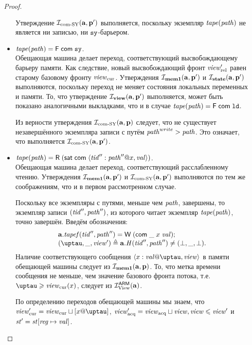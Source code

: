 \begin{proof}
\begin{itemize}
     Утверждение $\mathcal{I}_{\textup{\rm com-SY}}(\mathbf{a}, \mathbf{p}')$ выполняется, поскольку экземпляр $\mathit{tape}(\mathit{path})$ не является ни записью,
     ни $\mathtt{sy}$-барьером.

   \item $\mathit{tape}(\mathit{path}) = \textsf{F} \; \mathsf{com} \; \mathtt{sy}$. \\
    Обещающая машина делает переход, соответствующий высвобождающему барьеру памяти.
    Как следствие, новый высвобождающий фронт $\mathit{view}_{\mathrm{rel}}'$ равен старому базовому фронту $\mathit{view}_{\mathrm{cur}}$.
    Утверждения $\mathcal{I}_{\rm \bf mem1}(\mathbf{a}, \mathbf{p}')$ и $\mathcal{I}_{\rm \bf state}(\mathbf{a}, \mathbf{p}')$ выполняются, поскольку
    переход не меняет состояния локальных переменных и памяти.
    То, что утверждение $\mathcal{I}_{\rm \bf view}(\mathbf{a}, \mathbf{p}')$ выполняется, может быть показано аналогичными выкладками,
    что и в случае $\mathit{tape}(\mathit{path}) = \textsf{F} \; \mathsf{com} \; \mathtt{ld}$.
     
    Из верности утверждения $\mathcal{I}_{\textup{\rm com-SY}}(\mathbf{a}, \mathbf{p})$ следует, что
    не существует незавершённого экземпляра записи с путём $\mathit{path}^{write} > \mathit{path}$.
    Это означает, что выполняется $\mathcal{I}_{\textup{\rm com-SY}}(\mathbf{a}, \mathbf{p}')$.

  \item $\mathit{tape}(\mathit{path}) = \textsf{R} \; (\mathsf{sat} \; \mathsf{com} \; \langle \mathit{tid}'': \mathit{path}''@ x,\mathit{val} \rangle)$. \\
    Обещающая машина делает переход, соответствующий расслабленному чтению.
    Утверждения $\mathcal{I}_{\rm \bf mem1}(\mathbf{a}, \mathbf{p}')$ и $\mathcal{I}_{\textup{\rm com-SY}}(\mathbf{a}, \mathbf{p}')$
    выполняются по тем же соображениям, что и в первом рассмотренном случае.

    Поскольку все экземпляры с путями, меньше чем $\mathit{path}$, завершены, то
    экземпляр записи $(\mathit{tid}'', \mathit{path}'')$, из которого читает экземпляр $\mathit{tape}(\mathit{path})$, точно завершён.
    Введём обозначения:
    \[\begin{array}{l}
    \aT.\tapef(\tId'', \cpath'') = \tapeWrite{(\tapeWriteCommitted{\_}{x}{\stval})}; \\
    (\tau, \_, \R') \triangleq \aT.\hmap(\tId'', \cpath'') \not = (\bot, \_ , \bot). \\
    \end{array}\]
    Наличие соответствующего сообщения $\writeEvt{x}{\stval}{\tau}{\R}$ в памяти обещающей машины
    следует из $\mathcal{I}_{\rm \bf mem1}(\mathbf{a}, \mathbf{p})$.
    То, что метка времени сообщения не меньше, чем значение базового фронта потока, т.е. $\tau \ge \Rcur(x)$,
    следует из $\mathcal{I}^\mathsf{ARM}_{\textup{\rm {View}}}(\mathbf{a})$.
  
  По определению переходов обещающей машины мы знаем, что
  $\Rcur' = \Rcur \sqcup [x@\tau]$, $\mathit{view}_{\mathrm{acq}}' = \mathit{view}_{\mathrm{acq}} \sqcup \mathit{view}, \mathit{view} \leqslant \mathit{view}'$ и $\mathit{st}' = \mathit{st}[\mathit{reg} \mapsto \mathit{val}]$.


\end{itemize}
\end{proof}
